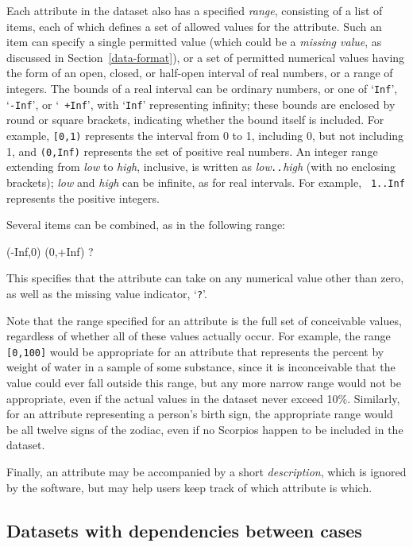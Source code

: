 Each attribute in the dataset also has a specified \emph{range},
consisting of a list of items, each of which defines a set of allowed
values for the attribute.  Such an item can specify a single permitted
value (which could be a \emph{missing value}, as discussed in
Section~\ref{data-format}), or a set of permitted numerical values
having the form of an open, closed, or half-open interval of real
numbers, or a range of integers.  The bounds of a real interval can be
ordinary numbers, or one of `{\tt Inf}', `{\tt -Inf}', or `{\tt
+Inf}', with `{\tt Inf}' representing infinity; these bounds are
enclosed by round or square brackets, indicating whether the bound
itself is included.  For example, {\tt [0,1)} represents the interval
from 0 to 1, including 0, but not including 1, and {\tt (0,Inf)}
represents the set of positive real numbers.  An integer range
extending from \emph{low} to \emph{high}, inclusive, is written as
\emph{low{\tt ..}high} (with no enclosing brackets); \emph{low} and
\emph{high} can be infinite, as for real intervals.  For example, {\tt
1..Inf} represents the positive integers.

Several items can be combined, as in the following range:\vspace{-5pt}
\begin{Session}
(-Inf,0)  (0,+Inf)  ?
\end{Session}\vspace{-5pt}
This specifies that the attribute can take on any numerical value
other than zero, as well as the missing value indicator,
`\texttt{?}'.

Note that the range specified for an attribute is the full set of
conceivable values, regardless of whether all of these values actually
occur.  For example, the range {\tt [0,100]} would be appropriate for
an attribute that represents the percent by weight of water in a
sample of some substance, since it is inconceivable that the value
could ever fall outside this range, but any more narrow range would
not be appropriate, even if the actual values in the dataset 
never exceed 10\%.  Similarly, for an attribute representing a person's
birth sign, the appropriate range would be all twelve signs of the
zodiac, even if no Scorpios happen to be included in the dataset.

Finally, an attribute may be accompanied by a short \emph{description},
which is ignored by the \delve{} software, but may help users keep track
of which attribute is which.


\subsection{Datasets with dependencies between cases}
\label{data-dependencies}

